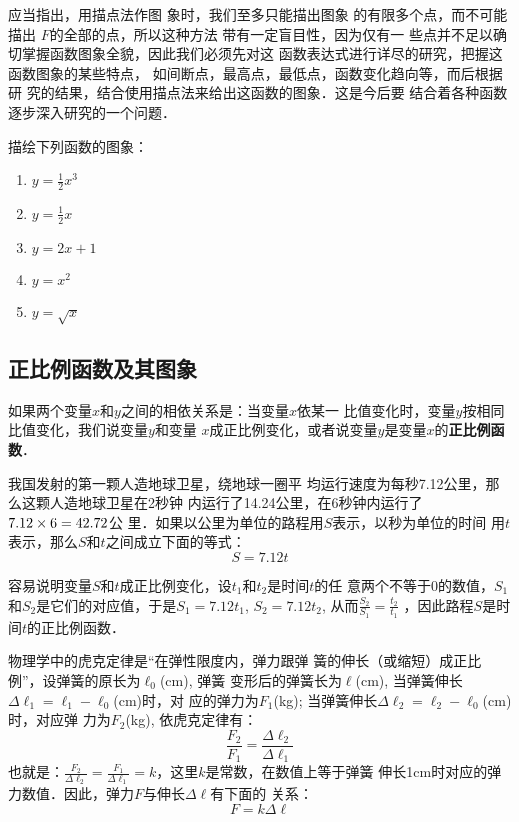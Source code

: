 应当指出，用描点法作图
象时，我们至多只能描出图象
的有限多个点，而不可能描出
$F$的全部的点，所以这种方法
带有一定盲目性，因为仅有一
些点并不足以确切掌握函数图象全貌，因此我们必须先对这
函数表达式进行详尽的研究，把握这函数图象的某些特点，
如间断点，最高点，最低点，函数变化趋向等，而后根据研
究的结果，结合使用描点法来给出这函数的图象．这是今后要
结合着各种函数逐步深入研究的一个问题．

\begin{ex}
描绘下列函数的图象：
\begin{multicols}{2}
\begin{enumerate}
    \item $y=\frac{1}{2}x^3$
    \item $y=\frac{1}{2}x$
    \item $y=2x+1$
    \item $y=x^2$
    \item $y=\sqrt{x}$
\end{enumerate}
\end{multicols}
\end{ex}

\subsection{正比例函数及其图象}
如果两个变量$x$和$y$之间的相依关系是：当变量$x$依某一
比值变化时，变量$y$按相同比值变化，我们说变量$y$和变量
$x$成正比例变化，或者说变量$y$是变量$x$的\textbf{正比例函数}．

\begin{example}
    我国发射的第一颗人造地球卫星，绕地球一圈平
均运行速度为每秒7.12公里，那么这颗人造地球卫星在2秒钟
内运行了14.24公里，在6秒钟内运行了$7.12\times6=42.72$公
里．如果以公里为单位的路程用$S$表示，以秒为单位的时间
用$t$表示，那么$S$和$t$之间成立下面的等式：
\[S=7.12t\]

容易说明变量$S$和$t$成正比例变化，设$t_1$和$t_2$是时间$t$的任
意两个不等于0的数值，$S_1$和$S_2$是它们的对应值，于是$S_1=
7.12t_1$, $S_2=7.12t_2$, 从而$\frac{S_2}{S_1}=\frac{t_2}{t_1}$
，因此路程$S$是时间$t$的正比例函数．
\end{example}

\begin{example}
    物理学中的虎克定律是“在弹性限度内，弹力跟弹
簧的伸长（或缩短）成正比例”，设弹簧的原长为$\ell_0$(cm), 弹簧
变形后的弹簧长为$\ell$(cm), 当弹簧伸长$\Delta \ell_1=\ell_1-\ell_0$(cm)时，对
应的弹力为$F_1$(kg); 当弹簧伸长$\Delta \ell_2=\ell_2-\ell_0$(cm)时，对应弹
力为$F_2$(kg), 依虎克定律有：
\[\frac{F_2}{F_1}=\frac{\Delta \ell_2}{\Delta \ell_1}\]
也就是：$\frac{F_2}{\Delta \ell_2}=\frac{F_1}{\Delta \ell_1}=k$，这里$k$是常数，在数值上等于弹簧
伸长1cm时对应的弹力数值．因此，弹力$F$与伸长$\Delta \ell$有下面的
关系：
\[F=k\Delta \ell\]
\end{example}


